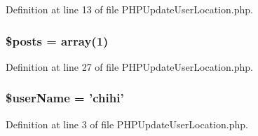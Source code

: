 Definition at line 13 of file P\-H\-P\-Update\-User\-Location.\-php.

\hypertarget{_p_h_p_update_user_location_8php_a9f4cad5a721e7f7711fba0bf0f7ec273}{
\subsubsection[{\$posts}]{\setlength{\rightskip}{0pt plus 5cm}\$posts = array(1)}}\label{_p_h_p_update_user_location_8php_a9f4cad5a721e7f7711fba0bf0f7ec273}


Definition at line 27 of file P\-H\-P\-Update\-User\-Location.\-php.

\hypertarget{_p_h_p_update_user_location_8php_aff20833df389a26c0f9384512eec4a68}{
\subsubsection[{\$user\-Name}]{\setlength{\rightskip}{0pt plus 5cm}\$user\-Name = 'chihi'}}\label{_p_h_p_update_user_location_8php_aff20833df389a26c0f9384512eec4a68}


Definition at line 3 of file P\-H\-P\-Update\-User\-Location.\-php.

